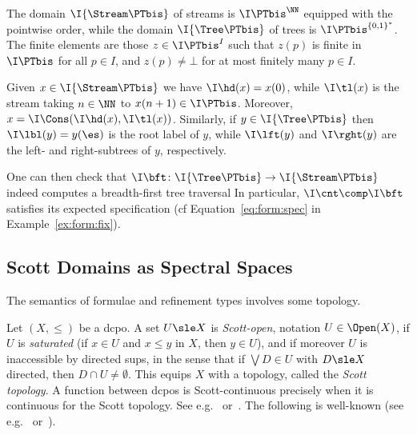 \begin{example}
\label{ex:scott:stream-tree}
The domain $\I{\Stream\PTbis}$ of streams is $\I\PTbis^\NN$
equipped with the pointwise order,
while the domain $\I{\Tree\PTbis}$ of trees is $\I\PTbis^{\{0,1\}^*}$.
The finite elements are those $z \in \I\PTbis^I$ such that $z(p)$ is finite in
$\I\PTbis$ for all $p \in I$,
and $z(p) \neq \bot$ for at most finitely many $p \in I$.

Given $x \in \I{\Stream\PTbis}$
we have $\I\hd(x) = x(0)$,
while $\I\tl(x)$ is the stream taking $n \in \NN$ to $x(n+1) \in \I\PTbis$.
Moreover, $x = \I\Cons(\I\hd(x),\I\tl(x))$.
%
Similarly, if $y \in \I{\Tree\PTbis}$
then $\I\lbl(y) = y(\es)$ is the root label of $y$,
while $\I\lft(y)$ and $\I\rght(y)$ are the left- and right-subtrees
of $y$, respectively.

One can then check that $\I\bft \colon \I{\Tree \PTbis} \to \I{\Stream \PTbis}$
indeed computes a breadth-first tree traversal%
%
In particular, $\I\cnt \comp \I\bft$
satisfies its expected specification
(cf Equation~\eqref{eq:form:spec} in Example~\ref{ex:form:fix}).
\lipicsEnd
\end{example}


\subsection{Scott Domains as Spectral Spaces}
\label{sec:spectral}

The semantics of formulae and refinement types involves some topology.

Let $(X,\leq)$ be a dcpo.
%
A set $U \sle X$ is \emph{Scott-open}, notation $U \in \Open(X)$,
if $U$ is \emph{saturated}
(if $x \in U$ and $x \leq y$ in $X$, then $y \in U$),
and if moreover $U$ is inaccessible by directed sups,
in the sense that if $\bigvee D \in U$
with $D \sle X$ directed, then $D \cap U \neq \emptyset$.
This equips $X$ with a topology, called the \emph{Scott topology}.
A function between dcpos is Scott-continuous
precisely when it is continuous for the Scott topology.
See e.g.~\cite[\S 1.2]{ac98book} or~\cite[\S 2.3]{aj95chapter}.
%
The following is well-known
(see e.g.~\cite[Theorem 7.2.29]{aj95chapter}
or~\cite[Theorem 7.47]{gg24book}).

